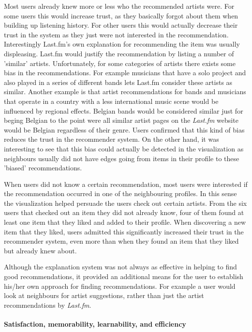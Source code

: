 Most users already knew more or less who the recommended artists were. For some users this would increase trust, as they basically forgot about them when building up listening history. For other users this would actually decrease their trust in the system as they just were not interested in the recommendation. Interestingly Last.fm's own explanation for recommending the item was usually displeasing. Last.fm would justify the recommendation by listing a number of 'similar' artists. Unfortunately, for some categories of artists there exists some bias in the recommendations. For example musicians that have a solo project and also played in a series of different bands lets Last.fm consider these artists as similar. Another example is that artist recommendations for bands and musicians that operate in a country with a less international music scene would be influenced by regional effects. Belgian bands would be considered similar just for beging Belgian to the point were all similar artist pages on the \emph{Last.fm} website would be Belgian regardless of their genre. Users confirmed that this kind of bias reduces the trust in the recommender system. On the other hand, it was interesting to see that this bias could actually be detected in the visualization as neighbours usually did not have edges going from items in their profile to these 'biased' recommendations.

When users did not know a certain recommendation, most users were interested if the recommendation occurred in one of the neighbouring profiles. In this sense the visualization helped persuade the users check out certain artists. From the six users that checked out an item they did not already know, four of them found at least one item that they liked and added to their profile. When discovering a new item that they liked, users admitted this significantly increased their trust in the recommender system, even more than when they found an item that they liked but already knew about.

Although the explanation system was not always as effective in helping to find good recommendations, it provided an additional means for the user to establish his/her own approach for finding recommendations. For example a user would look at neighbours for artist suggestions, rather than just the artist recommendations by \emph{Last.fm}.



\paragraph{Satisfaction, memorability, learnability, and efficiency}

